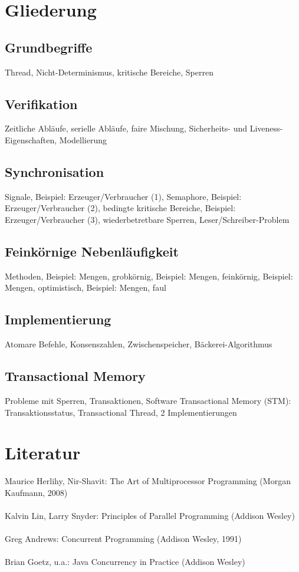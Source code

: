 \documentclass[a4paper]{scrreprt}
\begin{document}
\tableofcontents

\chapter*{Gliederung}

\section*{Grundbegriffe}
Thread, Nicht-Determinismus, kritische Bereiche, Sperren

\section*{Verifikation}
Zeitliche Abläufe, serielle Abläufe, faire Mischung, Sicherheits- und Liveness-Eigenschaften, Modellierung

\section*{Synchronisation}
Signale, Beispiel: Erzeuger/Verbraucher (1), Semaphore, Beispiel: Erzeuger/Verbraucher (2), bedingte kritische Bereiche, Beispiel: Erzeuger/Verbraucher (3), wiederbetretbare Sperren, Leser/Schreiber-Problem

\section*{Feinkörnige Nebenläufigkeit}
Methoden, Beispiel: Mengen, grobkörnig, Beispiel: Mengen, feinkörnig, Beispiel: Mengen, optimistisch, Beispiel: Mengen, faul

\section*{Implementierung}
Atomare Befehle, Konsenszahlen, Zwischenspeicher, Bäckerei-Algorithmus

\section*{Transactional Memory}
Probleme mit Sperren, Transaktionen, Software Transactional Memory (STM): Transaktionsstatus, Transactional Thread, 2 Implementierungen

\chapter*{Literatur}
Maurice Herlihy, Nir-Shavit: The Art of Multiprocessor Programming (Morgan Kaufmann, 2008)\\
\\
Kalvin Lin, Larry Snyder: Principles of Parallel Programming (Addison Wesley)\\
\\
Greg Andrews: Concurrent Programming (Addison Wesley, 1991)\\
\\
Brian Goetz, u.a.: Java Concurrency in Practice (Addison Wesley)







\end{document}
